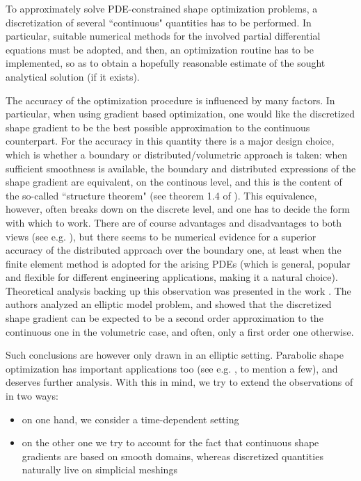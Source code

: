 \documentclass[english,a4paper,10pt,oneside]{scrbook}	%
\theoremstyle{break}
\theoremstyle{remark}
\begin{document}
To approximately solve PDE-constrained shape optimization problems, a discretization of several ``continuous" quantities has to be performed. In particular, suitable numerical methods for the involved partial differential equations must be adopted, and then, an optimization routine has to be implemented, so as to obtain a hopefully reasonable estimate of the sought analytical solution (if it exists).

The accuracy of the optimization procedure is influenced by many factors. In particular, when using gradient based optimization, one would like the discretized shape gradient to be the best possible approximation to the continuous counterpart. For the accuracy in this quantity there is a major design choice, which is whether a boundary or distributed/volumetric approach is taken: when sufficient smoothness is available, the boundary and distributed expressions of the shape gradient are equivalent, on the continous level, and this is the content of the so-called ``structure theorem" (see theorem 1.4 of \cite{avg_adj}). This equivalence, however, often breaks down on the discrete level, and one has to decide the form with which to work. There are of course advantages and disadvantages to both views (see e.g. \cite{avg_adj}), but there seems to be numerical evidence for a superior accuracy of the distributed approach over the boundary one, at least when the finite element method is adopted for the arising PDEs (which is general, popular and flexible for different engineering applications, making it a natural choice). Theoretical analysis backing up this observation was presented in the work \cite{paganini}. The authors analyzed an elliptic model problem, and showed that the discretized shape gradient can be expected to be a second order approximation to the continuous one in the volumetric case, and often, only a first order one otherwise. 

Such conclusions are however only drawn in an elliptic setting. Parabolic shape optimization has important applications too (see e.g. \cite{lindemann2}, \cite{harbrecht} to mention a few), and deserves further analysis. With this in mind, we try to extend the observations of \cite{paganini} in two ways: 

\begin{itemize}
\item on one hand, we consider a time-dependent setting
\item on the other one we try to account for the fact that continuous shape gradients are based on smooth domains, whereas discretized quantities naturally live on simplicial meshings
\end{itemize}
\end{document}
